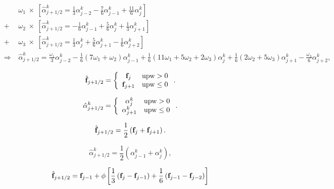 \documentclass{article}
\begin{document}
\begin{align} &\ \omega_1\ \times\ \left[ \hat{\alpha}^k_{j+1/2} = \frac{1}{3} {\alpha}^k_{j-2} - \frac{7}{6} {\alpha}^k_{j-1} + \frac{11}{6} {\alpha}^k_j \right]\\ + &\ \omega_2\ \times\ \left[ \hat{\alpha}^k_{j+1/2} = -\frac{1}{6} {\alpha}^k_{j-1} + \frac{5}{6} {\alpha}^k_j + \frac{1}{3} {\alpha}^k_{j+1} \right]\\ + &\ \omega_3\ \times\ \left[ \hat{\alpha}^k_{j+1/2} = \frac{1}{3} {\alpha}^k_j + \frac{5}{6} {\alpha}^k_{j+1} - \frac{1}{6} {\alpha}^k_{j+2} \right]\\ \Rightarrow &\ \hat{\alpha}^k_{j+1/2} = \frac{\omega_1}{3} {\alpha}^k_{j-2} - \frac{1}{6}(7\omega_1+\omega_2){\alpha}^k_{j-1} + \frac{1}{6}(11\omega_1+5\omega_2+2\omega_3){\alpha}^k_j + \frac{1}{6}(2\omega_2+5\omega_3){\alpha}^k_{j+1} - \frac{\omega_3}{6}{\alpha}^k_{j+2}, \end{align}
\pagebreak

\begin{equation} \hat{\bf f}_{j+1/2} = \left\{\begin{array}{cc} {\bf f}_{j} & {\rm upw} > 0 \\ {\bf f}_{j+1} & {\rm upw} \le 0 \end{array}\right.. \end{equation}
\pagebreak

\begin{equation} \hat{\alpha}^k_{j+1/2} = \left\{\begin{array}{cc} {\alpha}^k_{j} & {\rm upw} > 0 \\ {\alpha}^k_{j+1} & {\rm upw} \le 0 \end{array}\right.. \end{equation}
\pagebreak

\begin{equation} \hat{\bf f}_{j+1/2} = \frac{1}{2}\left( {\bf f}_{j} + {\bf f}_{j+1} \right). \end{equation}
\pagebreak

\begin{equation} \hat{\alpha}^k_{j+1/2} = \frac{1}{2} \left( {\alpha}^k_{j-1} + {\alpha}^k_j \right), \end{equation}
\pagebreak

\begin{equation} \hat{\bf f}_{j+1/2} = {\bf f}_{j-1} + \phi \left[\frac{1}{3}\left({\bf f}_j-{\bf f}_{j-1}\right) + \frac{1}{6}\left({\bf f}_{j-1}-{\bf f}_{j-2}\right)\right] \end{equation}
\pagebreak
\end{document}
